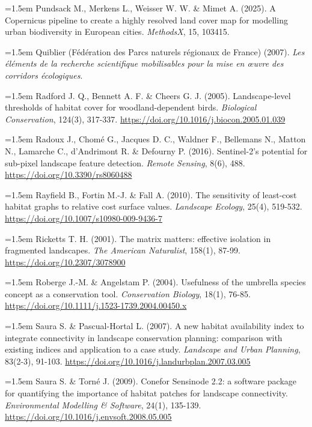 \documentclass[a4paper,12pt]{report}
\begin{document}
\noindent\hangindent=1.5em Pundsack M., Merkens L., Weisser W. W. \& Mimet A. (2025). A Copernicus pipeline to create a highly resolved land cover map for modelling urban biodiversity in European cities. \textit{MethodsX}, 15, 103415.\par\medskip
\noindent\hangindent=1.5em Quiblier (Fédération des Parcs naturels régionaux de France) (2007). \textit{Les éléments de la recherche scientifique mobilisables pour la mise en œuvre des corridors écologiques}.\par\medskip
\noindent\hangindent=1.5em Radford J. Q., Bennett A. F. \& Cheers G. J. (2005). Landscape-level thresholds of habitat cover for woodland-dependent birds. \textit{Biological Conservation}, 124(3), 317-337. \url{https://doi.org/10.1016/j.biocon.2005.01.039}\par\medskip
\noindent\hangindent=1.5em Radoux J., Chomé G., Jacques D. C., Waldner F., Bellemans N., Matton N., Lamarche C., d'Andrimont R. \& Defourny P. (2016). Sentinel-2's potential for sub-pixel landscape feature detection. \textit{Remote Sensing}, 8(6), 488. \url{https://doi.org/10.3390/rs8060488}\par\medskip
\noindent\hangindent=1.5em Rayfield B., Fortin M.-J. \& Fall A. (2010). The sensitivity of least-cost habitat graphs to relative cost surface values. \textit{Landscape Ecology}, 25(4), 519-532. \url{https://doi.org/10.1007/s10980-009-9436-7}\par\medskip
\noindent\hangindent=1.5em Ricketts T. H. (2001). The matrix matters: effective isolation in fragmented landscapes. \textit{The American Naturalist}, 158(1), 87-99. \url{https://doi.org/10.2307/3078900}\par\medskip
\noindent\hangindent=1.5em Roberge J.-M. \& Angelstam P. (2004). Usefulness of the umbrella species concept as a conservation tool. \textit{Conservation Biology}, 18(1), 76-85. \url{https://doi.org/10.1111/j.1523-1739.2004.00450.x}\par\medskip
\noindent\hangindent=1.5em Saura S. \& Pascual-Hortal L. (2007). A new habitat availability index to integrate connectivity in landscape conservation planning: comparison with existing indices and application to a case study. \textit{Landscape and Urban Planning}, 83(2-3), 91-103. \url{https://doi.org/10.1016/j.landurbplan.2007.03.005}\par\medskip
\noindent\hangindent=1.5em Saura S. \& Torné J. (2009). Conefor Sensinode 2.2: a software package for quantifying the importance of habitat patches for landscape connectivity. \textit{Environmental Modelling \& Software}, 24(1), 135-139. \url{https://doi.org/10.1016/j.envsoft.2008.05.005}\par\medskip
\end{document}
